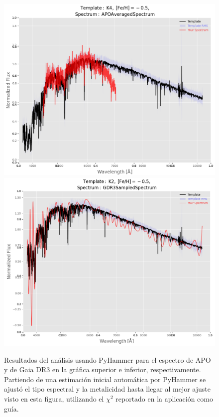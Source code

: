 \begin{figure}[!ht]
    \centering
    \includegraphics[scale=0.43]{Conclusion/Figures/Figura PyHammer APO.png} \\
    \vspace{0.6em}
    \includegraphics[scale=0.43]{Conclusion/Figures/Figura PyHammer GDR3.png}
    \caption{Resultados del análisis usando PyHammer para el espectro de APO y
    de Gaia DR3 en la gráfica superior e inferior, respectivamente. Partiendo de
    una estimación inicial automática por PyHammer se ajustó el tipo espectral y
    la metalicidad hasta llegar al mejor ajuste visto en esta figura, utilizando
    el $\chi^2$ reportado en la aplicación como guía.}
    \label{figuraAjustePyHammer}
\end{figure}


